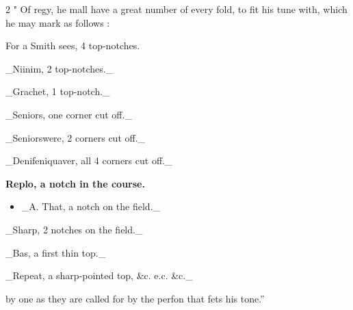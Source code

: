 \documentclass[10pt]{article}
\begin{document}
\begin{multicols}{2}
" Of regy, he mall have a great number of every fold, to fit his tune with, which he may mark as follows :

For a Smith sees, 4 top-notches.

\_Niinim, 2 top-notches.\_

\_Grachet, 1 top-notch.\_

\_Seniors, one corner cut off.\_

\_Seniorswere, 2 corners cut off.\_

\_Denifeniquaver, all 4 corners cut off.\_

\textbf{Replo, a notch in the course.}

\begin{itemize}\setlength{\itemsep}{1pt}
\item \_A. That, a notch on the field.\_
\end{itemize}
\_Sharp, 2 notches on the field.\_

\_Bas, a first thin top.\_

\_Repeat, a sharp-pointed top, \&c. e.c. \&c.\_

by one as they are called for by the perfon that fets his tone.”


\end{multicols}
\end{document}
